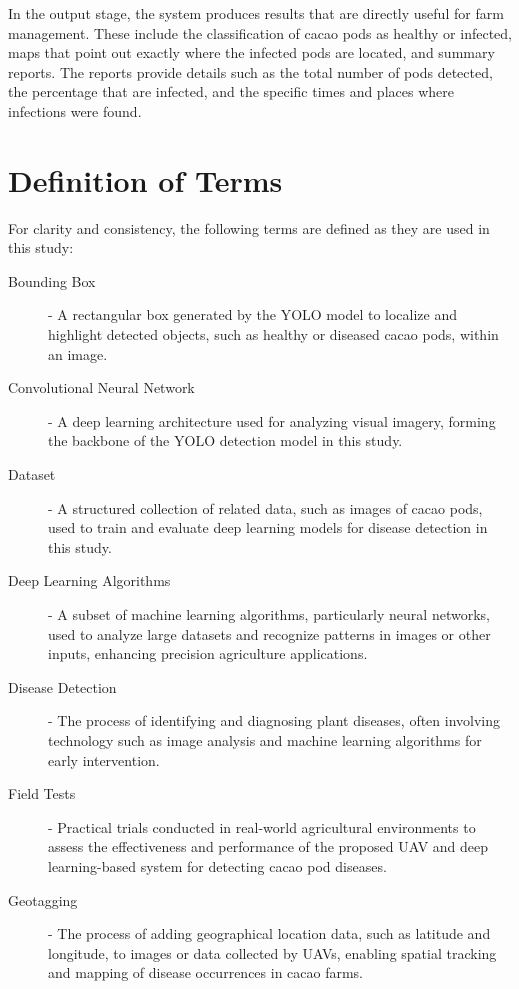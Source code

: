 {In the output stage, the system produces results that are directly useful for farm management. These include the classification of cacao pods as healthy or infected, maps that point out exactly where the infected pods are located, and summary reports. The reports provide details such as the total number of pods detected, the percentage that are infected, and the specific times and places where infections were found.


\section{Definition of Terms}

For clarity and consistency, the following terms are defined as they are used in this study:

\begin{description}
	\item[Bounding Box] - A rectangular box generated by the YOLO model to localize and highlight detected objects, such as healthy or diseased cacao pods, within an image.
	
	\item[Convolutional Neural Network] - A deep learning architecture used for analyzing visual imagery, forming the backbone of the YOLO detection model in this study.
	
	\item[Dataset] - A structured collection of related data, such as images of cacao pods, used to train and evaluate deep learning models for disease detection in this study.

	\item[Deep Learning Algorithms] - A subset of machine learning algorithms, particularly neural networks, used to analyze large datasets and recognize patterns in images or other inputs, enhancing precision agriculture applications.

	\item[Disease Detection] - The process of identifying and diagnosing plant diseases, often involving technology such as image analysis and machine learning algorithms for early intervention.

	\item[Field Tests] - Practical trials conducted in real-world agricultural environments to assess the effectiveness and performance of the proposed UAV and deep learning-based system for detecting cacao pod diseases.

	\item[Geotagging] - The process of adding geographical location data, such as latitude and longitude, to images or data collected by UAVs, enabling spatial tracking and mapping of disease occurrences in cacao farms.
	

\end{description}}

